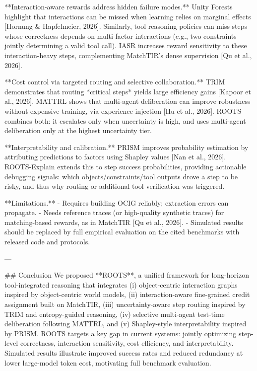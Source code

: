 **Interaction-aware rewards address hidden failure modes.** Unity Forests highlight that interactions can be missed when learning relies on marginal effects [Hornung & Hapfelmeier, 2026]. Similarly, tool reasoning policies can miss steps whose correctness depends on multi-factor interactions (e.g., two constraints jointly determining a valid tool call). IASR increases reward sensitivity to these interaction-heavy steps, complementing MatchTIR’s dense supervision [Qu et al., 2026].

**Cost control via targeted routing and selective collaboration.** TRIM demonstrates that routing *critical steps* yields large efficiency gains [Kapoor et al., 2026]. MATTRL shows that multi-agent deliberation can improve robustness without expensive training, via experience injection [Hu et al., 2026]. ROOTS combines both: it escalates only when uncertainty is high, and uses multi-agent deliberation only at the highest uncertainty tier.

**Interpretability and calibration.** PRISM improves probability estimation by attributing predictions to factors using Shapley values [Nan et al., 2026]. ROOTS-Explain extends this to step success probabilities, providing actionable debugging signals: which objects/constraints/tool outputs drove a step to be risky, and thus why routing or additional tool verification was triggered.

**Limitations.**
- Requires building OCIG reliably; extraction errors can propagate.
- Needs reference traces (or high-quality synthetic traces) for matching-based rewards, as in MatchTIR [Qu et al., 2026].
- Simulated results should be replaced by full empirical evaluation on the cited benchmarks with released code and protocols.

---

## Conclusion
We proposed **ROOTS**, a unified framework for long-horizon tool-integrated reasoning that integrates (i) object-centric interaction graphs inspired by object-centric world models, (ii) interaction-aware fine-grained credit assignment built on MatchTIR, (iii) uncertainty-aware step routing inspired by TRIM and entropy-guided reasoning, (iv) selective multi-agent test-time deliberation following MATTRL, and (v) Shapley-style interpretability inspired by PRISM. ROOTS targets a key gap in current systems: jointly optimizing step-level correctness, interaction sensitivity, cost efficiency, and interpretability. Simulated results illustrate improved success rates and reduced redundancy at lower large-model token cost, motivating full benchmark evaluation.

